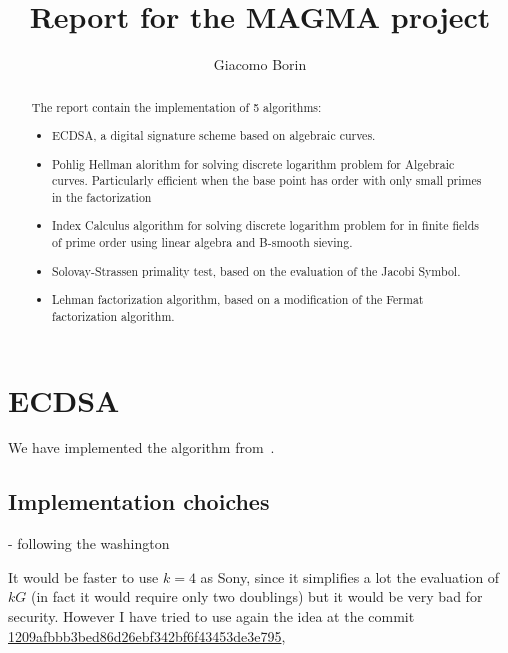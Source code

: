 \documentclass{article}
\title{Report for the MAGMA project}
\author{Giacomo Borin}
\theoremstyle{plain}
\theoremstyle{remark}
\theoremstyle{definition}
\begin{document}
\maketitle

\begin{abstract}
	The report contain the implementation of 5 algorithms:
	\begin{itemize}
		\item ECDSA, a digital signature scheme based on algebraic curves.
		\item Pohlig Hellman alorithm for solving discrete logarithm problem for Algebraic curves. Particularly efficient when the base point has order with only small primes in the factorization
		\item Index Calculus algorithm for solving discrete logarithm problem for in finite fields of prime order using linear algebra and B-smooth sieving.
		\item Solovay-Strassen primality test, based on the evaluation of the Jacobi Symbol.
		\item Lehman factorization algorithm, based on a modification of the Fermat factorization algorithm.
	\end{itemize}

\end{abstract}


\section{ECDSA}

We have implemented the algorithm from~\cite[Section 6.6]{washington}.




\subsection{Implementation choiches}

- following the washington

It would be faster to use $k = 4$ as Sony, since it simplifies a lot the evaluation of $kG$ (in fact it would require only two doublings) but it would be very bad for security. However I have tried to use again the idea at the commit \href{https://github.com/giacomoborin/project2_MAGMA/commit/1209afbbb3bed86d26ebf342bf6f43453de3e795}{1209afbbb3bed86d26ebf342bf6f43453de3e795},
\end{document}
